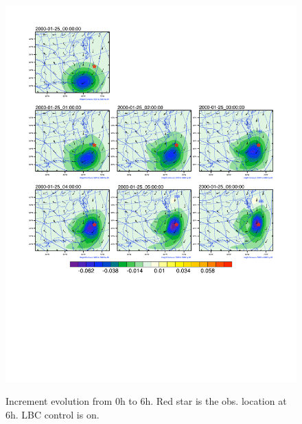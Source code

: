\documentclass[12pt]{article}
\begin{document}
\begin{figure}[t]
  \noindent\includegraphics[width=45pc,trim=10 200 10 10, clip, angle=0]{centerlbcjcdf.pdf}\\
  \caption{Increment evolution from 0h to 6h. Red star is the obs. location at 6h. LBC control is on.}\label{f1}
\end{figure}
\end{document}
